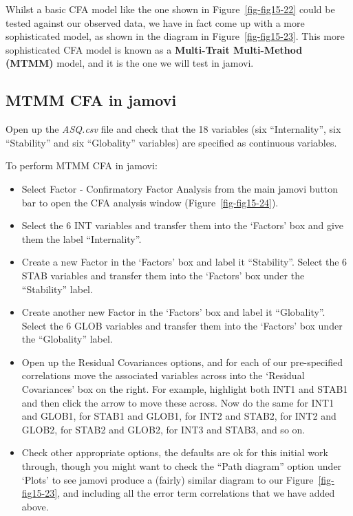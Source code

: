\documentclass[
  a4paper,
]{book}
\begin{document}
Whilst a basic CFA model like the one shown in Figure~\ref{fig-fig15-22}
could be tested against our observed data, we have in fact come up with
a more sophisticated model, as shown in the diagram in
Figure~\ref{fig-fig15-23}. This more sophisticated CFA model is known as
a \textbf{Multi-Trait Multi-Method (MTMM)} model, and it is the one we
will test in jamovi.

\hypertarget{mtmm-cfa-in-jamovi}{%
\subsection{MTMM CFA in jamovi}\label{mtmm-cfa-in-jamovi}}

Open up the \emph{ASQ.csv} file and check that the 18 variables (six
``Internality'', six ``Stability'' and six ``Globality'' variables) are
specified as continuous variables.

To perform MTMM CFA in jamovi:

\begin{itemize}
\item
  Select Factor - Confirmatory Factor Analysis from the main jamovi
  button bar to open the CFA analysis window
  (Figure~\ref{fig-fig15-24}).
\item
  Select the 6 INT variables and transfer them into the `Factors' box
  and give them the label ``Internality''.
\item
  Create a new Factor in the `Factors' box and label it ``Stability''.
  Select the 6 STAB variables and transfer them into the `Factors' box
  under the ``Stability'' label.
\item
  Create another new Factor in the `Factors' box and label it
  ``Globality''. Select the 6 GLOB variables and transfer them into the
  `Factors' box under the ``Globality'' label.
\item
  Open up the Residual Covariances options, and for each of our
  pre-specified correlations move the associated variables across into
  the `Residual Covariances' box on the right. For example, highlight
  both INT1 and STAB1 and then click the arrow to move these across. Now
  do the same for INT1 and GLOB1, for STAB1 and GLOB1, for INT2 and
  STAB2, for INT2 and GLOB2, for STAB2 and GLOB2, for INT3 and STAB3,
  and so on.
\item
  Check other appropriate options, the defaults are ok for this initial
  work through, though you might want to check the ``Path diagram''
  option under `Plots' to see jamovi produce a (fairly) similar diagram
  to our Figure~\ref{fig-fig15-23}, and including all the error term
  correlations that we have added above.
\end{itemize}
\end{document}
